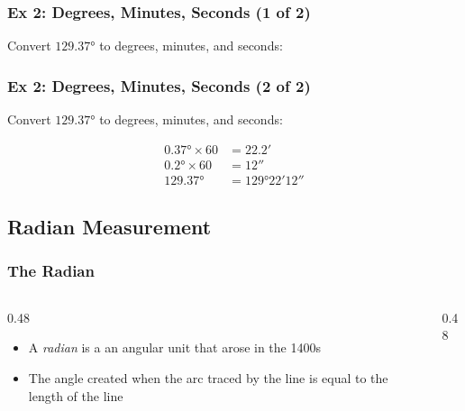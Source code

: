\begin{frame}
	\frametitle{Ex 2: Degrees, Minutes, Seconds (1 of 2)}

    Convert $\ang{129.37}$ to degrees, minutes, and seconds:

    
\end{frame}

\begin{frame}
	\frametitle{Ex 2: Degrees, Minutes, Seconds (2 of 2)}

    Convert $\ang{129.37}$ to degrees, minutes, and seconds:

    \begin{align*}
        \ang{0.37} \times 60 &= \ang{;22.2}\\
        \ang{0.2} \times 60 &= \ang{;;12}\\
        \ang{129.37} &= \ang{129;22;12}
    \end{align*}
    
\end{frame}

\subsection{Radian Measurement}

\begin{frame}
	\frametitle{The Radian}

    \begin{columns}
        \begin{column}{0.48\linewidth}
            \begin{itemize}[<+- | alert@+>]
                \item A \emph{radian} is a an angular unit that arose in the 1400s
                \item The angle created when the arc traced by the line is equal to the length of the line
            \end{itemize}
        \end{column}
        \begin{column}{0.48\linewidth}
            \centering
            \resizebox{\linewidth}{!}{
                
            }
        \end{column}
    \end{columns}
\end{frame}

